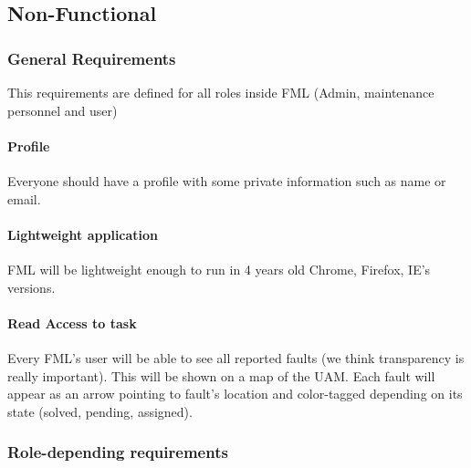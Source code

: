 
\subsection{Non-Functional}

\subsubsection{General Requirements}

This requirements are defined for all roles inside FML (Admin, maintenance personnel and user)

\paragraph{Profile} Everyone should have a profile with some private information such as name or email.

\paragraph{Lightweight application} FML will be lightweight enough to run in 4 years old Chrome, Firefox, IE's versions.

\paragraph{Read Access to task} Every FML's user will be able to see all reported faults (we think transparency is really important). This will be shown on a map of the UAM. Each fault will appear as an arrow pointing to fault's location and color-tagged depending on its state (solved, pending, assigned).

\subsubsection{Role-depending requirements}

